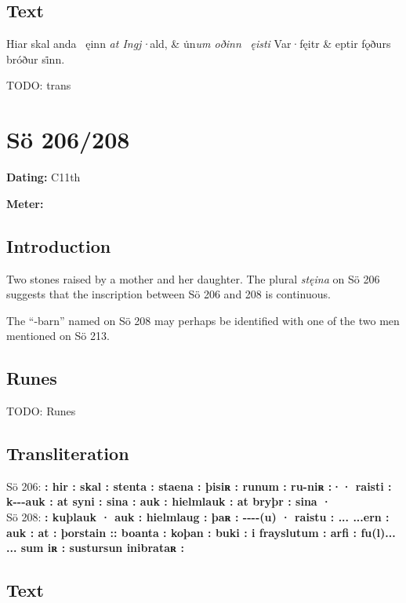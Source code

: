\subsection{Text}

\bvg\bva[]%
Hiar skal anda \hld\ ęinn \emph{at Ingj·}ald, &
u̇n\emph{um oðinn} \hld\ \emph{ęisti} Var·fęitr &
eptir fǫðurs bróður si̇nn.\eva

\bpb TODO: trans\epb\epg

\sectionline\clearpage


\section{Sö 206/208}

\begin{flushright}%
\textbf{Dating:} C11th

\textbf{Meter:} \Fornyrdislag
\end{flushright}%

\subsection{Introduction}

Two stones raised by a mother and her daughter.  The plural \emph{stęina} on Sö 206 suggests that the inscription between Sö 206 and 208 is continuous.

The “-barn” named on Sö 208 may perhaps be identified with one of the two men mentioned on Sö 213.

\subsection{Runes}

TODO: Runes%

\subsection{Transliteration}

Sö 206: \textbf{: hir : skal : stenta : staena : þisiʀ : runum : ru-niʀ :·· raisti : k-{}-{}-auk : at syni : sina : auk : hielmlauk : at bryþr : sina ·} \\
Sö 208: \textbf{: kuþlauk · auk : hielmlaug : þaʀ : -{}-{}-{}-(u) · raistu : ... ...ern : auk : at : þorstain :: boanta : koþan : buki : i frayslutum : arfi : fu(l)... ... sum iʀ : sustursun inibrataʀ :}

\subsection{Text}

